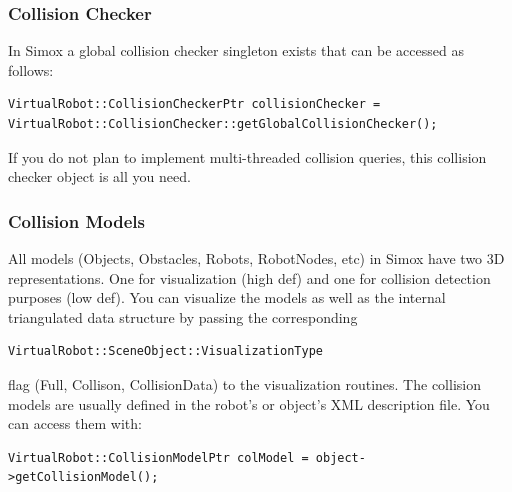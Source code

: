 \documentclass{book}
\begin{document}
\subsubsection{Collision Checker}
\par
In Simox a global collision checker singleton exists that can be accessed as follows: 
\begin{lstlisting}
VirtualRobot::CollisionCheckerPtr collisionChecker = VirtualRobot::CollisionChecker::getGlobalCollisionChecker();
\end{lstlisting}
If you do not plan to implement multi-threaded collision queries, this collision checker object is all you need. 
\par
\subsubsection{Collision Models}
All models (Objects, Obstacles, Robots, RobotNodes, etc) in Simox have two 3D representations. One for visualization (high def) and one for collision detection purposes (low def). You can visualize the models as well as the internal triangulated data structure by passing the corresponding \\
\begin{lstlisting}
VirtualRobot::SceneObject::VisualizationType 
\end{lstlisting}
flag (Full, Collison, CollisionData) to the visualization routines. The collision models are usually defined in the robot's or object's XML description file. You can access them with: 
\begin{lstlisting}
VirtualRobot::CollisionModelPtr colModel = object->getCollisionModel();
\end{lstlisting}
\end{document}

